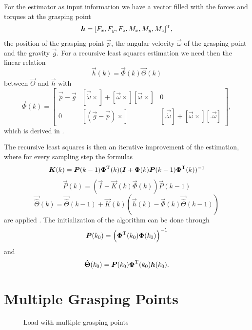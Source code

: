 For the estimator as input information we have a vector filled with the forces and torques at the grasping point
\begin{equation}
	\boldsymbol{h} = [F_x, F_y, F_z, M_x, M_y, M_z]^{\mathrm{T}},
\end{equation}
the position of the grasping point $\vec p$, the angular velocity $\vec \omega$ of the grasping point and the gravity $\vec g$. For a recursive least squares estimation we need then the linear relation
\begin{equation}
	\vec{h}(k) = \vec{\Phi}(k) \vec{\Theta}(k)
\end{equation}
between $\vec{\Theta}$ and $\vec{h}$ with
\begin{equation}
	\vec{\Phi}(k) = 
	\begin{bmatrix}
		\vec{\ddot p} - \vec{g}	& [\vec{\dot \omega} \times] + [\vec{\omega}\times] [\vec{\omega} \times]	& 0 \\
		0			& [(\vec{g} - \vec{\ddot p}) \times]									& [.  \vec{\dot \omega}] + [\vec{\omega} \times] [. \vec{\omega}]
	\end{bmatrix},
\end{equation}
which is derived in \cite{literaturstelle1}.

The recursive least squares is then an iterative improvement of the estimation, where for every sampling step the formulas
\begin{equation}
	\boldsymbol{K}(k) = \boldsymbol{P}(k-1) \boldsymbol{\Phi}^{\mathrm{T}}(k) (\boldsymbol{I} + \boldsymbol{\Phi}(k) \boldsymbol{P}(k - 1) \boldsymbol{\Phi}^{\mathrm{T}}(k))^{-1}
\end{equation}
\begin{equation}
	\vec{P}(k) = (\vec{I} - \vec{K}(k) \vec{\Phi}(k)) \vec{P}(k - 1)
\end{equation}
\begin{equation}
	\vec{\hat \Theta}(k)=\vec{ \hat \Theta}(k - 1) + \vec{K}(k) (\vec{h}(k) - \vec{\Phi}(k) \vec{\hat \Theta}(k - 1))
\end{equation}
are applied \cite{literaturstelle4}. The initialization of the algorithm can be done through
\begin{equation}
	\boldsymbol{P}(k_0) = \left( \boldsymbol{\Phi}^{\mathrm{T}}(k_0) \boldsymbol{\Phi}(k_0) \right)^{-1}
\end{equation}
and
\begin{equation}
	\boldsymbol{\hat \Theta} (k_0) = \boldsymbol{P}(k_0) \boldsymbol{\Phi}^{\mathrm{T}}(k_0) \boldsymbol{h}(k_0).
\end{equation}

\section{Multiple Grasping Points}
\label{sec:multiple_grasping_points}
\begin{figure}
	\centering
	
	\caption{Load with multiple grasping points}
	\label{fig:load_multiple_grasping_points}
\end{figure}

